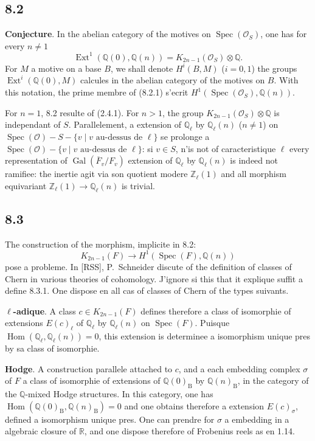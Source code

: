 \documentclass[12pt,a4paper]{article}
\theoremstyle{plain}
\theoremstyle{definition}
\theoremstyle{remark}
\DeclareMathOperator{\Hom}{Hom}
\DeclareMathOperator{\Spec}{Spec}
\DeclareMathOperator{\Gal}{Gal}
\DeclareMathOperator{\Ext}{Ext}
\newcommand{\B}{\mathrm{B}}
\newcommand{\Z}{\mathbb{Z}}
\newcommand{\Q}{\mathbb{Q}}
\newcommand{\R}{\mathbb{R}}
\begin{document}
\subsection*{8.2}
\textbf{Conjecture}. In the abelian category of the motives on $\Spec(\mathcal{O}_S)$, one has for every $n \neq 1$
\begin{equation*}\tag{8.2.1}
\Ext^1(\Q(0), \Q(n)) = K_{2n-1}(\mathcal{O}_S) \otimes \Q.
\end{equation*}
For $M$ a motive on a base $B$, we shall denote $H^i(B, M)$ ($i = 0, 1$) the groups $\Ext^i(\Q(0), M)$ calcules in the abelian category of the motives on $B$. With this notation, the prime membre of (8.2.1) s'ecrit $H^1(\Spec(\mathcal{O}_S), \Q(n))$.

For $n = 1$, 8.2 resulte of (2.4.1). For $n > 1$, the group $K_{2n-1}(\mathcal{O}_S) \otimes \Q$ is independant of $S$. Parallelement, a extension of $\Q_\ell$ by $\Q_\ell(n)$ ($n \neq 1$) on $\Spec(\mathcal{O}) - S - \{v \mid v \text{ au-dessus de } \ell\}$ se prolonge a $\Spec(\mathcal{O}) - \{v \mid v \text{ au-dessus de } \ell\}$: si $v \in S$, n'is not of caracteristique $\ell$ every representation of $\Gal(\overline{F}_v/F_v)$ extension of $\Q_\ell$ by $\Q_\ell(n)$ is indeed not ramifiee: the inertie agit via son quotient modere $\Z_\ell(1)$ and all morphism equivariant $\Z_\ell(1) \to \Q_\ell(n)$ is trivial.

\subsection*{8.3}
The construction of the morphism, implicite in 8.2:
\begin{equation*}\tag{8.3.1}
K_{2n-1}(F) \longrightarrow H^1(\Spec(F), \Q(n))
\end{equation*}
pose a probleme. In [RSS], P.~Schneider discute of the definition of classes of Chern in various theories of cohomology. J'ignore si this that it explique suffit a define 8.3.1. One dispose en all cas of classes of Chern of the types suivants.

\textbf{$\ell$-adique}. A class $c \in K_{2n-1}(F)$ defines therefore a class of isomorphie of extensions $E(c)_\ell$ of $\Q_\ell$ by $\Q_\ell(n)$ on $\Spec(F)$. Puisque $\Hom(\Q_\ell, \Q_\ell(n)) = 0$, this extension is determinee a isomorphism unique pres by sa class of isomorphie.

\textbf{Hodge}. A construction parallele attached to $c$, and a each embedding complex $\sigma$ of $F$ a class of isomorphie of extensions of $\Q(0)_\B$ by $\Q(n)_\B$, in the category of the $\Q$-mixed Hodge structures. In this category, one has $\Hom(\Q(0)_\B, \Q(n)_\B) = 0$ and one obtains therefore a extension $E(c)_\sigma$, defined a isomorphism unique pres. One can prendre for $\sigma$ a embedding in a algebraic closure of $\R$, and one dispose therefore of Frobenius reels as en 1.14.
\end{document}
